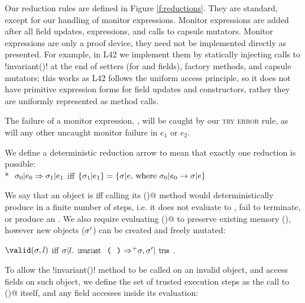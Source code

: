 Our reduction rules are defined in Figure \ref{f:reductions}.
They are standard, except for our handling of monitor expressions. Monitor expressions are added after all field updates, \Q@new@ expressions, and calls to capsule mutators.
Monitor expressions are only a proof device, they need not be implemented directly as presented.
For example, in L42 we implement them by statically injecting calls to \Q!invariant()! at the end of setters (for \Q@imm@ and \Q@capsule@ fields), factory methods, and capsule mutators; this works as L42 follows the uniform access principle, so it does not have primitive expression forms for field updates and constructors, rather they are uniformly represented as method calls.

The failure of a monitor expression, , will be caught by our \textsc{try error} rule, as will any other uncaught monitor failure in $e_1$ or $e_2$.

We define a deterministic reduction arrow to mean that exactly one reduction is possible:\\*
\indent$\ \sigma_0|e_0\Rightarrow \sigma_1|e_1$ iff $\{\sigma_1|e_1\}=\{\sigma|e \text{, where } \sigma_0|e_0\rightarrow \sigma|e\}$

\noindent We say that an object is \valid iff calling its \Q@invariant()@ method would
deterministically produce \Q@true@ in a finite number of steps, i.e. it does not evaluate to \Q@false@, fail to terminate, or produce an \error.
We also require evaluating \Q@invariant()@ to preserve existing memory (\s), however new objects ($\sigma'$) can be created and freely mutated:

\indent$\valid(\s,l)$ iff $\s | l.\invariant {\Rightarrow^+} \s,\s' | \Kw{true}$.%

\noindent 
To allow the \Q!invariant()! method to be called on an invalid object, and access fields on such object, we define the set of trusted execution steps as the call to \Q@invariant()@ itself, and any field accesses inside its evaluation:

